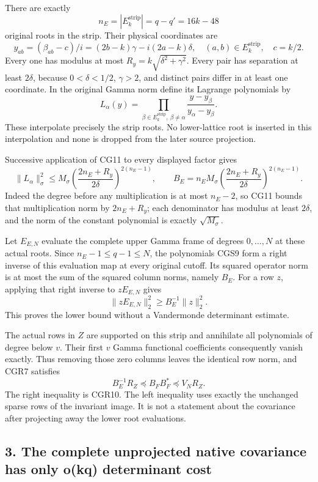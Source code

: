There are exactly \[
n_E=|E_k^{\mathrm{strip}}|=q-q'=16k-48
\tag{CGS7}
\] original roots in the strip. Their physical coordinates are \[
y_{ab}=(\beta_{ab}-c)/i=(2b-k)\gamma-i(2a-k)\delta,
\quad (a,b)\in E_k^{\mathrm{strip}},\quad c=k/2.
\tag{CGS8}
\] Every one has modulus at most \(R_y=k\sqrt{\delta^2+\gamma^2}\). Every pair has separation at least \(2\delta\), because \(0<\delta<1/2\), \(\gamma>2\), and distinct pairs differ in at least one coordinate. In the original Gamma norm define its Lagrange polynomials by \[
L_\alpha(y)=\prod_{\beta\in E_k^{\mathrm{strip}},\ \beta\ne\alpha}
\frac{y-y_\beta}{y_\alpha-y_\beta}.
\tag{CGS9}
\] These interpolate precisely the strip roots. No lower-lattice root is inserted in this interpolation and none is dropped from the later source projection.

Successive application of CG11 to every displayed factor gives \[
\|L_\alpha\|_\sigma^2
\le M_\sigma\left(\frac{2n_E+R_y}{2\delta}\right)^{2(n_E-1)},
\qquad
B_E=n_EM_\sigma
\left(\frac{2n_E+R_y}{2\delta}\right)^{2(n_E-1)}.
\tag{CGS10}
\] Indeed the degree before any multiplication is at most \(n_E-2\), so CG11 bounds that multiplication norm by \(2n_E+R_y\); each denominator has modulus at least \(2\delta\), and the norm of the constant polynomial is exactly \(\sqrt{M_\sigma}\).

Let \(E_{E,N}\) evaluate the complete upper Gamma frame of degrees \(0,\ldots,N\) at these actual roots. Since \(n_E-1\le q-1\le N\), the polynomials CGS9 form a right inverse of this evaluation map at every original cutoff. Its squared operator norm is at most the sum of the squared column norms, namely \(B_E\). For a row \(z\), applying that right inverse to \(zE_{E,N}\) gives \[
\|zE_{E,N}\|_2^2\ge B_E^{-1}\|z\|_2^2.
\tag{CGS11}
\] This proves the lower bound without a Vandermonde determinant estimate.

The actual rows in \(Z\) are supported on this strip and annihilate all polynomials of degree below \(v\). Their first \(v\) Gamma functional coefficients consequently vanish exactly. Thus removing those zero columns leaves the identical row norm, and CGR7 satisfies \[
\boxed{B_E^{-1}R_Z\preceq B_FB_F^*\preceq V_NR_Z.}
\tag{CGS12}
\] The right inequality is CGR10. The left inequality uses exactly the unchanged sparse rows of the invariant image. It is not a statement about the covariance after projecting away the lower root evaluations.

\subsection{3. The complete unprojected native covariance has only o(kq) determinant cost}\label{the-complete-unprojected-native-covariance-has-only-okq-determinant-cost}

